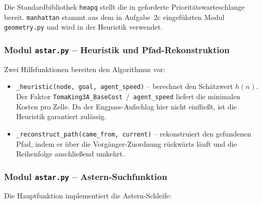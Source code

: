 

Die Standardbibliothek \texttt{heapq} stellt die in \textcite[S. 21\,f.]{5} geforderte Prioritätswarteschlange bereit. \texttt{manhattan} stammt aus dem in Aufgabe~2c eingeführten Modul \texttt{geometry.py} und wird in der Heuristik verwendet.


\subsubsection{Modul \texttt{astar.py} – Heuristik und Pfad-Rekonstruktion}
\label{sssec:astar_heuristic_3b}

Zwei Hilfsfunktionen bereiten den Algorithmus vor:



\begin{itemize}
    \item \texttt{\_heuristic(node, goal, agent\_speed)} -- berechnet den Schätzwert \(h(n)\). Der Faktor \texttt{TomaKing3A\_BaseCost}~\(/\)~\texttt{agent\_speed} liefert die minimalen Kosten pro Zelle. Da der Engpass-Aufschlag hier nicht einfließt, ist die Heuristik garantiert zulässig.
    \item \texttt{\_reconstruct\_path(came\_from, current)} -- rekonstruiert den gefundenen Pfad, indem er über die Vorgänger-Zuordnung rückwärts läuft und die Reihenfolge anschließend umkehrt.
\end{itemize}


\subsubsection{Modul \texttt{astar.py} – \acs{Astern}-Suchfunktion}
\label{sssec:astar_main_3b}

Die Hauptfunktion implementiert die \acs{Astern}-Schleife:



